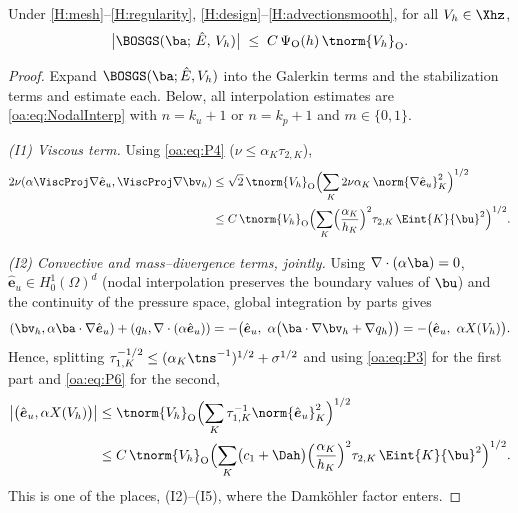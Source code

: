 \begin{lemma}
\label{oa:lem:interpolation}
Under \cref{H:mesh}--\cref{H:regularity}, \cref{H:design}--\cref{H:advectionsmooth}, for all $V_h \in \Xhz$,
\begin{equation}
  \label{oa:eq:InterpolationBound}
  \bigl| \BOSGS(\ba;\, \hat E,\, V_h) \bigr|
  \;\le\; C\,\Psi_{\mathrm O}(h)\,\tnorm{V_h}_{\mathrm{O}}.
\end{equation}
\end{lemma}

\begin{proof}
Expand $\BOSGS(\ba; \hat E, V_h)$ into the Galerkin terms and the
stabilization terms and estimate each. Below, all interpolation estimates are
\cref{oa:eq:NodalInterp} with $n = k_u+1$ or $n = k_p+1$ and $m \in \{0,1\}$.

\smallskip\noindent
\emph{(I1) Viscous term.} Using \cref{oa:eq:P4} ($\nu \le \alpha_K\tau_{2,K}$),
\begin{align*}
  2\nu(\alpha\ViscProj\nabla\hat{\boldsymbol e}_u, \ViscProj\nabla\bv_h)
  &\le \sqrt{2}\,\tnorm{V_h}_{\mathrm{O}}\Bigl( \sum_K 2\nu\alpha_K\,
  \norm{\nabla\hat{\boldsymbol e}_u}_K^2 \Bigr)^{1/2}\\
  &\le C\,\tnorm{V_h}_{\mathrm{O}}\Bigl( \sum_K
  \Bigl(\frac{\alpha_K}{h_K}\Bigr)^2\tau_{2,K}\,\Eint{K}{\bu}^2 \Bigr)^{1/2}.
\end{align*}

\smallskip\noindent
\emph{(I2) Convective and mass--divergence terms, jointly.} Using
$\nabla\cdot(\alpha\ba) = 0$, $\hat{\boldsymbol e}_u \in H^1_0(\Omega)^d$
(nodal interpolation preserves the boundary values of $\bu$) and the continuity of the
pressure space, global integration by parts gives
\[
  (\bv_h, \alpha\ba\cdot\nabla\hat{\boldsymbol e}_u)
  + (q_h, \nabla\cdot(\alpha\hat{\boldsymbol e}_u))
  = -\bigl( \hat{\boldsymbol e}_u,\ \alpha\bigl(\ba\cdot\nabla\bv_h + \nabla q_h\bigr)
  \bigr)
  = -\bigl( \hat{\boldsymbol e}_u,\ \alpha X(V_h) \bigr).
\]
Hence, splitting $\tau_{1,K}^{-1/2} \le (\alpha_K\tns^{-1})^{1/2} + \sigma^{1/2}$ and
using \cref{oa:eq:P3} for the first part and \cref{oa:eq:P6} for the second,
\[
\begin{aligned}
  \bigl|\bigl(\hat{\boldsymbol e}_u, \alpha X(V_h)\bigr)\bigr|
  &\le \tnorm{V_h}_{\mathrm{O}} \Bigl( \sum_K \tau_{1,K}^{-1} \norm{\hat{\boldsymbol e}_u}_K^2
  \Bigr)^{1/2} \\
  &\le C\,\tnorm{V_h}_{\mathrm{O}}\Bigl( \sum_K \bigl(c_1 + \Dah\bigr)
  \Bigl(\frac{\alpha_K}{h_K}\Bigr)^2 \tau_{2,K}\,\Eint{K}{\bu}^2 \Bigr)^{1/2}.
\end{aligned}
\]
This is one of the places, (I2)--(I5), where the Damk\"ohler factor enters.


\end{proof}
